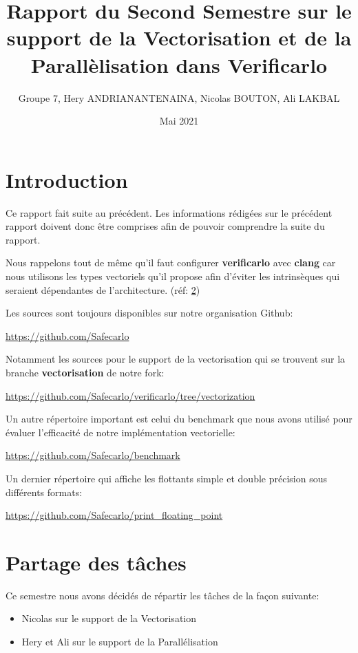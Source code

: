 \documentclass[11pt, letterpaper]{article}
\author{Groupe 7, Hery ANDRIANANTENAINA, Nicolas BOUTON, Ali LAKBAL}
\date{Mai 2021}
\title{Rapport du Second Semestre sur le support de la Vectorisation et de la Parallèlisation dans Verificarlo}
\begin{document}
\maketitle
\tableofcontents


\section{Introduction}
\label{sec:orgdb3c3d0}

Ce rapport fait suite au précédent. Les informations rédigées sur le précédent
rapport doivent donc être comprises afin de pouvoir comprendre la suite du
rapport.

Nous rappelons tout de même qu'il faut configurer \textbf{verificarlo} avec \textbf{clang}
car nous utilisons les types vectoriels qu'il propose afin d'éviter les
intrinsèques qui seraient dépendantes de l'architecture. (réf: \hyperref[org9e56591]{2})

Les sources sont toujours disponibles sur notre organisation Github:

\url{https://github.com/Safecarlo}

Notamment les sources pour le support de la vectorisation qui se trouvent sur
la branche \textbf{vectorisation} de notre fork:

\url{https://github.com/Safecarlo/verificarlo/tree/vectorization}

Un autre répertoire important est celui du benchmark que nous avons utilisé
pour évaluer l'efficacité de notre implémentation vectorielle:

\url{https://github.com/Safecarlo/benchmark}

Un dernier répertoire qui affiche les flottants simple et double précision
sous différents formats:

\url{https://github.com/Safecarlo/print\_floating\_point}

\section{Partage des tâches}
\label{sec:orga7cf6ef}

Ce semestre nous avons décidés de répartir les tâches de la façon suivante:
\begin{itemize}
\item Nicolas sur le support de la Vectorisation
\item Hery et Ali sur le support de la Parallélisation
\end{itemize}
\end{document}

